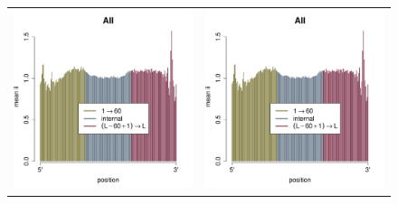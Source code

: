 \documentclass[a4paper,10pt, twocolumn]{article}
\begin{document}
\begin{figure}
\centering
\begin{tabular}{c c}
\includegraphics[scale=.45, page = 1]{insertion-position-bias.pdf} &
\includegraphics[scale=.45, page = 2]{insertion-position-bias.pdf} \\

\end{tabular}
\end{figure}
\end{document}
